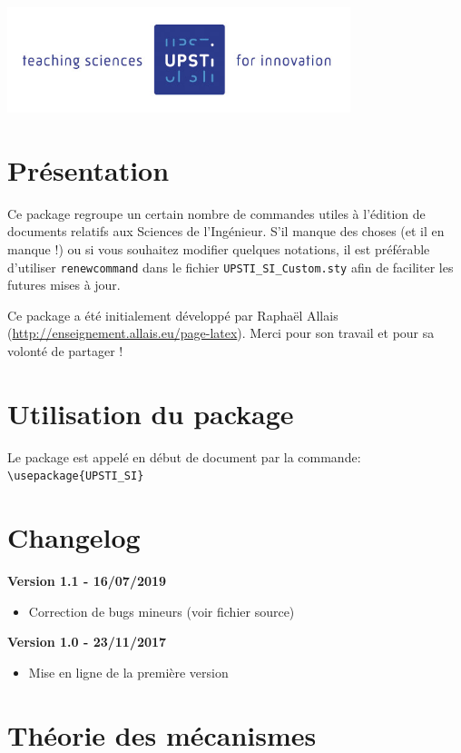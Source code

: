 \documentclass[11pt]{ltxdockit}[2010/09/26]
\begin{document}
\printtitlepage

\begin{center}
	\includegraphics[width=10cm]{Images/logoUPSTI.jpg}
\end{center}

\tableofcontents

\pagebreak
\section{Présentation}
Ce package regroupe un certain nombre de commandes utiles à l'édition de documents relatifs aux Sciences de l'Ingénieur. S'il manque des choses (et il en manque !) ou si vous souhaitez modifier quelques notations, il est préférable d'utiliser \verb!renewcommand! dans le fichier \verb!UPSTI_SI_Custom.sty! afin de faciliter les futures mises à jour.

Ce package a été initialement développé par Raphaël Allais (\url{http://enseignement.allais.eu/page-latex}). Merci pour son travail et pour sa volonté de partager !

\section{Utilisation du package}
\noindent Le package est appelé en début de document par la commande: \verb!\usepackage{UPSTI_SI}!

\section{Changelog}
\noindent\textbf{Version 1.1 - 16/07/2019}
\begin{itemize}
\item Correction de bugs mineurs (voir fichier source)
\end{itemize}
\noindent\textbf{Version 1.0 - 23/11/2017}
\begin{itemize}
\item Mise en ligne de la première version
\end{itemize}

\section{Théorie des mécanismes}
\end{document}
